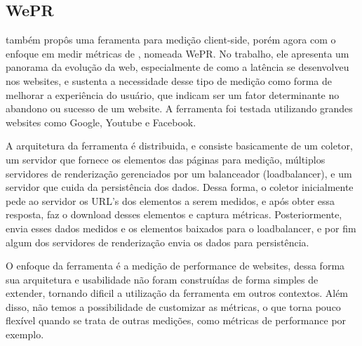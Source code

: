 \documentclass[12pt]{tcc}
\begin{document}
		\subsection{WePR}
		\par \citep{Asrese2019MeasuringWL} também propôs uma feramenta para medição client-side, porém agora com o enfoque em medir métricas de , nomeada WePR. No trabalho, ele apresenta um panorama da evolução da web, especialmente de como a latência se desenvolveu nos websites, e sustenta a necessidade desse tipo de medição como forma de melhorar a experiência do usuário, que indicam ser um fator determinante no abandono ou sucesso de um website. A ferramenta foi testada utilizando grandes websites como Google, Youtube e Facebook. 
		\par A arquitetura da ferramenta é distribuida, e consiste basicamente de um coletor, um servidor que fornece os elementos das páginas para medição, múltiplos servidores de renderização gerenciados por um balanceador (loadbalancer), e um servidor que cuida da persistência dos dados. Dessa forma, o coletor inicialmente pede ao servidor os URL’s dos elementos a serem medidos, e após obter essa resposta, faz o download desses elementos e captura métricas. Posteriormente, envia esses dados medidos e os elementos baixados para o loadbalancer, e por fim algum dos servidores de renderização envia os dados para persistência.
		\par O enfoque da ferramenta é a medição de performance de websites, dessa forma sua arquitetura e usabilidade não foram construídas de forma simples de extender, tornando dificil a utilização da ferramenta em outros contextos. Além disso, não temos a possibilidade de customizar as métricas, o que torna pouco flexível quando se trata de outras medições, como métricas de performance por exemplo.
		
\end{document}
